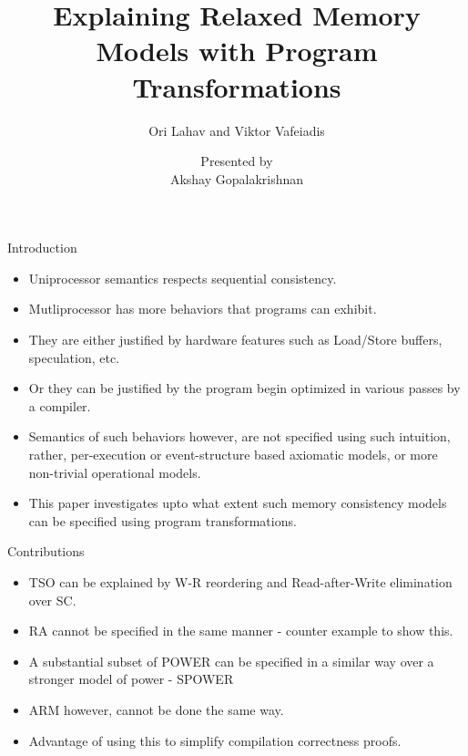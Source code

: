 \documentclass[xcolor={dvipsnames}, notes]{beamer}
\title{Explaining Relaxed Memory Models with Program Transformations}
\subtitle{Ori Lahav and Viktor Vafeiadis}
\author{Presented by \\ Akshay Gopalakrishnan}
\begin{document}
    
    \begin{frame}

        \maketitle

    \end{frame}

    \begin{frame}{Introduction}
    
        \begin{itemize}
            \item Uniprocessor semantics respects sequential consistency.
            \item Mutliprocessor has more behaviors that programs can exhibit.
            \item They are either justified by hardware features such as Load/Store buffers, speculation, etc.
            \item Or they can be justified by the program begin optimized in various passes by a compiler. 
            \item Semantics of such behaviors however, are not specified using such intuition, rather, per-execution or event-structure based axiomatic models, or more non-trivial operational models.
            \item This paper investigates upto what extent such memory consistency models can be specified using program transformations.  
        \end{itemize}
        
    \end{frame}

    \begin{frame}{Contributions}

        \begin{itemize}
            \item TSO can be explained by W-R reordering and Read-after-Write elimination over SC.
            \item RA cannot be specified in the same manner - counter example to show this.
            \item A substantial subset of POWER can be specified in a similar way over a stronger model of power - SPOWER
            \item ARM however, cannot be done the same way.
            \item Advantage of using this to simplify compilation correctness proofs.
        \end{itemize}
        
    \end{frame}
\end{document}

